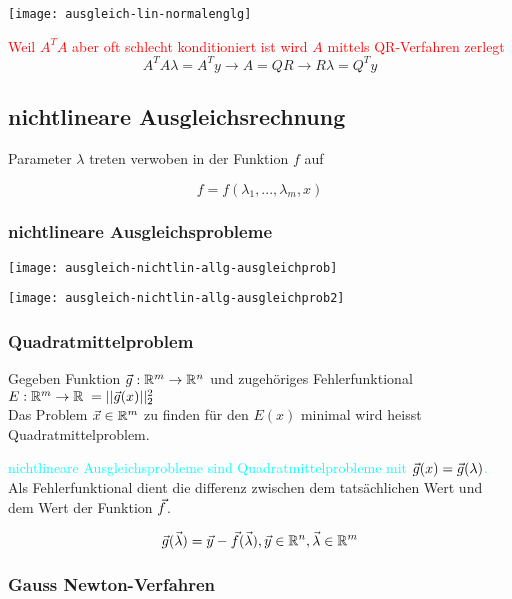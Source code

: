 \texttt{[image: ausgleich-lin-normalenglg]}

\textcolor{red}{Weil $A^T A$ aber oft schlecht konditioniert ist wird $A$ mittels
	QR-Verfahren zerlegt
}
{\Large
	$$A^T A \lambda = A^T y \rightarrow A = QR \rightarrow R \lambda = Q^T y$$
}





\subsection{nichtlineare Ausgleichsrechnung}

Parameter $\lambda$ treten verwoben in der Funktion $f$ auf

$$f = f(\lambda_1, ..., \lambda_m, x)$$

\subsubsection{nichtlineare Ausgleichsprobleme}

\texttt{[image: ausgleich-nichtlin-allg-ausgleichprob]}

\texttt{[image: ausgleich-nichtlin-allg-ausgleichprob2]}



\subsubsection{Quadratmittelproblem}

Gegeben Funktion $\vec g: \mathbb{R}^m \to \mathbb{R}^n$ und zugehöriges Fehlerfunktional
$E: \mathbb{R}^m \to \mathbb{R} \; = || \vec g(x) ||_2^2$ \\
Das Problem $\vec x \in \mathbb{R}^m$ zu finden für den $E(x)$ minimal wird heisst
Quadratmittelproblem.

\textcolor{cyan}{nichtlineare Ausgleichsprobleme sind Quadratmittelprobleme
	mit $\vec g(x) = \vec g(\lambda)$.}
Als Fehlerfunktional dient die differenz zwischen dem tatsächlichen Wert und dem
Wert der Funktion $\vec f$.

{\large
		$$\vec g(\vec \lambda) = \vec y - \vec f(\vec \lambda), \vec y \in \mathbb{R}^n, \vec \lambda \in \mathbb{R}^m$$
}



\subsubsection{Gauss Newton-Verfahren}

